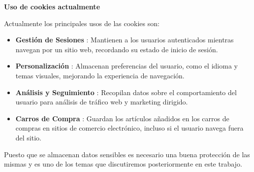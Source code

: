 \bigskip

\textbf{Uso de cookies actualmente}

Actualmente los principales usos de las cookies son:

\begin{itemize}
    \item \textbf{Gestión de Sesiones} : Mantienen a los usuarios autenticados mientras navegan por un sitio web, recordando su estado de inicio de sesión.
    \item \textbf{Personalización} : Almacenan preferencias del usuario, como el idioma y temas visuales, mejorando la experiencia de navegación.
    \item \textbf{Análisis y Seguimiento} : Recopilan datos sobre el comportamiento del usuario para análisis de tráfico web y marketing dirigido.
    \item \textbf{Carros de Compra} : Guardan los artículos añadidos en los carros de compras en sitios de comercio electrónico, incluso si el usuario navega fuera del sitio.
\end{itemize}

Puesto que se almacenan datos sensibles es necesario una buena protección de las mismas y es uno de los temas que discutiremos posteriormente en este trabajo.





